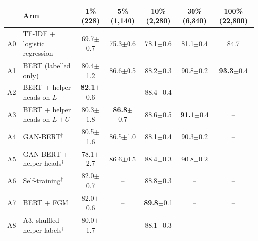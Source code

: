 \begin{tabular}{llccccc}
\toprule
 & Arm & 1\% (228) & 5\% (1,140) & 10\% (2,280) & 30\% (6,840) & 100\% (22,800) \\
\midrule
A0 & TF-IDF + logistic regression & 69.7{\scriptsize$\pm${0.7}} & 75.3{\scriptsize$\pm${0.6}} & 78.1{\scriptsize$\pm${0.6}} & 81.1{\scriptsize$\pm${0.4}} & 84.7 \\
A1 & BERT (labelled only) & 80.4{\scriptsize$\pm${1.2}} & 86.6{\scriptsize$\pm${0.5}} & 88.2{\scriptsize$\pm${0.3}} & 90.8{\scriptsize$\pm${0.2}} & \textbf{93.3}{\scriptsize$\pm${0.4}} \\
A2 & BERT + helper heads on $L$ & \textbf{82.1}{\scriptsize$\pm${0.6}} & -- & 88.4{\scriptsize$\pm${0.4}} & -- & -- \\
A3 & BERT + helper heads on $L{+}U$$^{\dagger}$ & 80.3{\scriptsize$\pm${1.8}} & \textbf{86.8}{\scriptsize$\pm${0.7}} & 88.6{\scriptsize$\pm${0.5}} & \textbf{91.1}{\scriptsize$\pm${0.4}} & -- \\
A4 & GAN-BERT$^{\dagger}$ & 80.5{\scriptsize$\pm${1.6}} & 86.5{\scriptsize$\pm${1.0}} & 88.1{\scriptsize$\pm${0.4}} & 90.3{\scriptsize$\pm${0.2}} & -- \\
A5 & GAN-BERT + helper heads$^{\dagger}$ & 78.1{\scriptsize$\pm${2.7}} & 86.6{\scriptsize$\pm${0.5}} & 88.4{\scriptsize$\pm${0.3}} & 90.8{\scriptsize$\pm${0.2}} & -- \\
A6 & Self-training$^{\dagger}$ & 82.0{\scriptsize$\pm${0.7}} & -- & 88.8{\scriptsize$\pm${0.3}} & -- & -- \\
A7 & BERT + FGM & 82.0{\scriptsize$\pm${0.6}} & -- & \textbf{89.8}{\scriptsize$\pm${0.1}} & -- & -- \\
A8 & A3, shuffled helper labels$^{\dagger}$ & 80.0{\scriptsize$\pm${1.7}} & -- & 88.1{\scriptsize$\pm${0.3}} & -- & -- \\
\bottomrule
\end{tabular}
